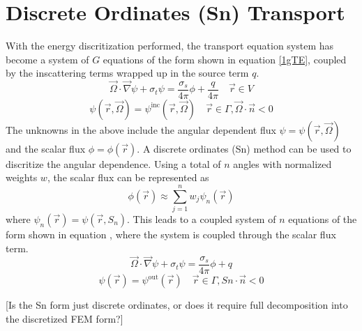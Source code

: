 \documentclass{article}
\newcommand{\vr}{\vec{r}}
\newcommand{\vO}{\vec{\Omega}}
\newcommand{\vgrad}{\vec{\nabla}}
\newcommand{\sigt}{\sigma_t}
\newcommand{\sigs}{\sigma_s}
\begin{document}
\section{Discrete Ordinates (Sn) Transport}
With the energy discritization performed, the transport equation system has become a system of $G$ equations of the form shown in equation \ref{1gTE}, coupled by the inscattering terms wrapped up in the source term $q$.
\begin{equation}
\label{1gTE}
\vO \cdot \vgrad \psi + \sigt \psi = \frac{\sigs}{4 \pi} \phi + \frac{q}{4 \pi} \quad \vr \in V 
\end{equation}
\begin{equation}
\psi(\vr,\vO) = \psi^{\text{inc}}(\vr,\vO) \quad \vr \in \Gamma, \vO \cdot \vec{n} < 0
\end{equation}
The unknowns in the above include the angular dependent flux $\psi=\psi(\vr,\vO)$ and the scalar flux $\phi=\phi(\vr)$. A discrete ordinates (Sn) method can be used to discritize the angular dependence. Using a total of $n$ angles with normalized weights $w$, the scalar flux can be represented as 
\[
\phi(\vr) \approx \sum_{j=1}^n w_j \psi_n(\vr)
\] 
where $\psi_n(\vr) = \psi(\vr, S_n)$. This leads to a coupled system of $n$ equations of the form shown in equation \cite{SnFwd}, where the system is coupled through the scalar flux term.
\begin{equation}
\label{snFwd}
\vO \cdot \vgrad \psi + \sigt \psi = \frac{\sigs}{4 \pi} \phi + q
\end{equation}
\begin{equation}
\psi(\vr) = \psi^{\text{out}}(\vr) \quad \vr \in \Gamma, Sn \cdot \vec{n} < 0
\end{equation}

{\color{red}[Is the Sn form just discrete ordinates, or does it require full decomposition into the discretized FEM form?]}
\end{document}
